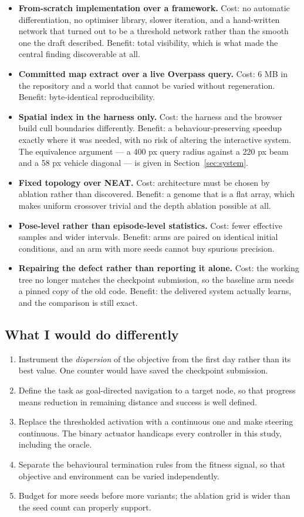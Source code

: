 \documentclass[conference]{IEEEtran}
\begin{document}
\begin{itemize}
\item \textbf{From-scratch implementation over a framework.} Cost: no automatic differentiation, no optimiser library, slower iteration, and a hand-written network that turned out to be a threshold network rather than the smooth one the draft described. Benefit: total visibility, which is what made the central finding discoverable at all.
\item \textbf{Committed map extract over a live Overpass query.} Cost: 6 MB in the repository and a world that cannot be varied without regeneration. Benefit: byte-identical reproducibility.
\item \textbf{Spatial index in the harness only.} Cost: the harness and the browser build cull boundaries differently. Benefit: a behaviour-preserving speedup exactly where it was needed, with no risk of altering the interactive system. The equivalence argument — a 400 px query radius against a 220 px beam and a 58 px vehicle diagonal — is given in Section~\ref{sec:system}.
\item \textbf{Fixed topology over NEAT.} Cost: architecture must be chosen by ablation rather than discovered. Benefit: a genome that is a flat array, which makes uniform crossover trivial and the depth ablation possible at all.
\item \textbf{Pose-level rather than episode-level statistics.} Cost: fewer effective samples and wider intervals. Benefit: arms are paired on identical initial conditions, and an arm with more seeds cannot buy spurious precision.
\item \textbf{Repairing the defect rather than reporting it alone.} Cost: the working tree no longer matches the checkpoint submission, so the baseline arm needs a pinned copy of the old code. Benefit: the delivered system actually learns, and the comparison is still exact.
\end{itemize}

\subsection{What I would do differently}

\begin{enumerate}
\item Instrument the \emph{dispersion} of the objective from the first day rather than its best value. One counter would have saved the checkpoint submission.
\item Define the task as goal-directed navigation to a target node, so that progress means reduction in remaining distance and success is well defined.
\item Replace the thresholded activation with a continuous one and make steering continuous. The binary actuator handicaps every controller in this study, including the oracle.
\item Separate the behavioural termination rules from the fitness signal, so that objective and environment can be varied independently.
\item Budget for more seeds before more variants; the ablation grid is wider than the seed count can properly support.
\end{enumerate}
\end{document}
